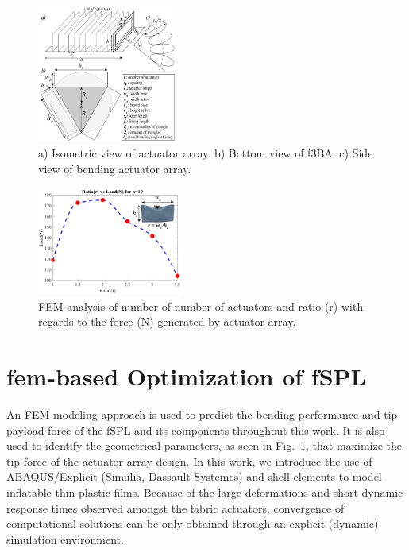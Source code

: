 \documentclass[letterpaper, 10 pt, conference]{ieeeconf}  %
\begin{document}


\begin{figure}[t!]

\centering
\includegraphics[width=0.41\textwidth]{Figures/geom_param_v6}
\setlength{\belowcaptionskip}{-20pt}
\caption{a) Isometric view of actuator array. b) Bottom view of f3BA. c) Side view of bending actuator array.}
\label{fig:geom_param}
\end{figure}

\begin{figure}[b!]
\vspace*{-0.65cm}
\centering
\includegraphics[width=0.43\textwidth]{Figures/fem_opti_v10}
\caption{FEM analysis of number of number of actuators and ratio (r) with regards to the force (N) generated by actuator array.}
\label{fig:fem_opti}
\end{figure}
\section{fem-based Optimization of fSPL}
An FEM modeling approach is used to predict the bending performance and tip payload force of the fSPL and its components throughout this work. It is also used to identify the geometrical parameters, as seen in Fig.~\ref{fig:geom_param}, that maximize the tip force of the actuator array design. In this work, we introduce the use of ABAQUS/Explicit (Simulia, Dassault Systemes) and shell elements to model inflatable thin plastic films. Because of the large-deformations and short dynamic response times observed amongst the fabric actuators, convergence of computational solutions can be only obtained through an explicit (dynamic) simulation environment.
\end{document}
